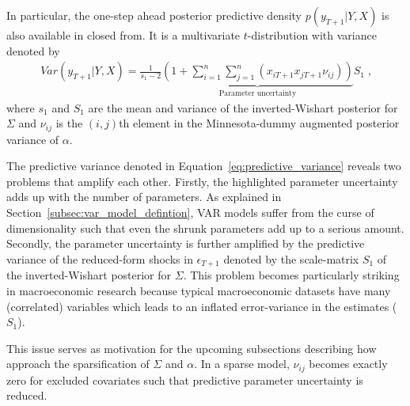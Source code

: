 In particular, the one-step ahead posterior predictive density $p(y_{T + 1} | Y , X)$ is also available in closed from. It is a multivariate $t$-distribution with variance denoted by
\begin{align}
    \label{eq:predictive_variance}
    Var(y_{T + 1} | Y , X) = \frac{1}{s_1 - 2} \underbrace{\left( 1 + \sum_{i = 1}^{n} \sum_{j = 1}^{n} (x_{i T + 1} x_{j T + 1} \nu_{ij}) \right)}_{\text{Parameter uncertainty}} S_1 \; \text{,}
\end{align}
where $s_1$ and $S_1$ are the mean and variance of the inverted-Wishart posterior for $\Sigma$ and $\nu_{ij}$ is the $(i,j)$th element in the Minnesota-dummy augmented posterior variance of $\alpha$.

The predictive variance denoted in Equation~\eqref{eq:predictive_variance} reveals two problems that amplify each other. Firstly, the highlighted parameter uncertainty adds up with the number of parameters. As explained in Section~\ref{subsec:var_model_defintion}, VAR models suffer from the curse of dimensionality such that even the shrunk parameters add up to a serious amount. Secondly, the parameter uncertainty is further amplified by the predictive variance of the reduced-form shocks in $\epsilon_{T + 1}$ denoted by the scale-matrix $S_1$ of the inverted-Wishart posterior for $\Sigma$. This problem becomes particularly striking in macroeconomic research because typical macroeconomic datasets have many (correlated) variables which leads to an inflated error-variance in the estimates ($S_1$).

This issue serves as motivation for the upcoming subsections describing how \textcite{hauzenberger_combining_2021} approach the sparsification of $\Sigma$ and $\alpha$. In a sparse model, $\nu_{ij}$ becomes exactly zero for excluded covariates such that predictive parameter uncertainty is reduced.

